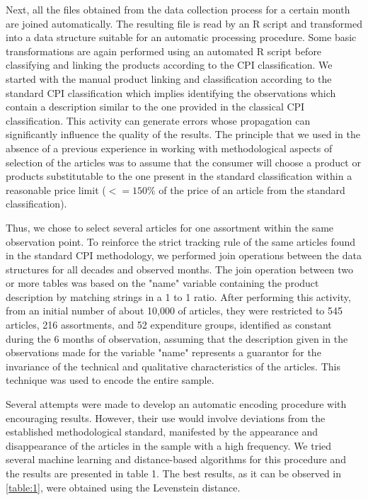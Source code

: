 \documentclass[]{article}
\begin{document}
Next, all the files obtained from the data collection process for a certain month are joined automatically. The resulting 
file is read by an R script and transformed into a data structure suitable for an automatic processing procedure. Some 
basic transformations are again performed using an automated R script before classifying and linking the products according 
to the CPI classification. We started with the manual product linking and classification according to the standard CPI 
classification which implies identifying the observations which contain a description similar to the one provided in the
classical CPI classification. This activity can generate errors whose propagation can significantly influence the quality 
of the results. The principle that we used in the absence of a previous experience in working with methodological aspects 
of selection of the articles was to assume that the consumer will choose a product or products substitutable to the one present 
in the standard classification within a reasonable price limit ($<= 150\%$ of the price of an article from the standard classification). 

Thus, we chose to select several articles for one assortment within the same observation point. To reinforce the strict tracking 
rule of the same articles found in the standard CPI methodology, we performed join operations between the data structures 
for all decades and observed months. The join operation between two or more tables was based on the "name" variable containing 
the product description by matching strings in a 1 to 1 ratio. After performing this activity, from an initial number 
of about 10,000 of articles, they were restricted to 545 articles, 216 assortments, and 52 expenditure groups, 
identified as constant during the 6 months of observation, assuming that the description given in the observations 
made for the variable "name" represents a guarantor for the invariance of the technical and qualitative characteristics 
of the articles. This technique was used to encode the entire sample.


Several attempts were made to develop an automatic encoding procedure with encouraging results. However, their use 
would involve deviations from the established methodological standard, manifested by the appearance and disappearance 
of the articles in the sample with a high frequency. We tried several machine learning and distance-based algorithms 
for this procedure and the results are presented in table 1. The best results, as it can be observed in \ref{table:1}, 
were obtained using the Levenstein distance.
\end{document}
